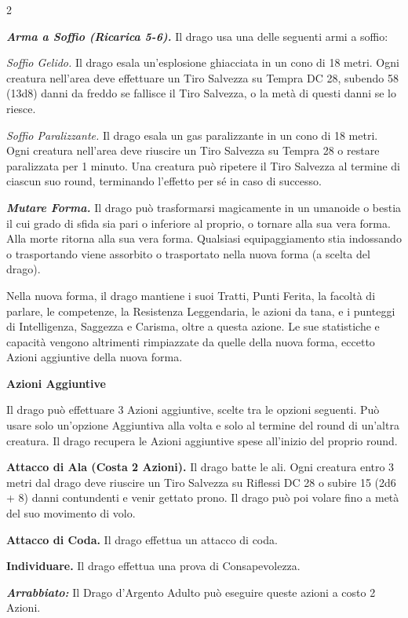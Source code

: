 \begin{multicols}{2}
{\emph{\textbf{Arma a Soffio (Ricarica 5-6).}} Il drago usa una delle seguenti armi a soffio:

\emph{Soffio Gelido.} Il drago esala un'esplosione ghiacciata in un cono di 18 metri. Ogni creatura nell'area deve effettuare un Tiro Salvezza su Tempra DC 28, subendo 58 (13d8) danni da freddo se fallisce il Tiro Salvezza, o la metà di questi danni se lo riesce.

\emph{Soffio Paralizzante.} Il drago esala un gas paralizzante in un cono di 18 metri. Ogni creatura nell'area deve riuscire un Tiro Salvezza su Tempra 28 o restare paralizzata per 1 minuto. Una creatura può ripetere il Tiro Salvezza al termine di ciascun suo round, terminando l'effetto per sé in caso di successo.

\emph{\textbf{Mutare Forma.}} Il drago può trasformarsi magicamente in un umanoide o bestia il cui grado di sfida sia pari o inferiore al proprio, o tornare alla sua vera forma. Alla morte ritorna alla sua vera forma. Qualsiasi equipaggiamento stia indossando o trasportando viene assorbito o trasportato nella nuova forma (a scelta del drago).

Nella nuova forma, il drago mantiene i suoi Tratti, Punti Ferita, la facoltà di parlare, le competenze, la Resistenza Leggendaria, le azioni da tana, e i punteggi di Intelligenza, Saggezza e Carisma, oltre a questa azione. Le sue statistiche e capacità vengono altrimenti rimpiazzate da quelle della nuova forma, eccetto Azioni aggiuntive della nuova forma.

\textbf{Azioni Aggiuntive}

Il drago può effettuare 3 Azioni aggiuntive, scelte tra le opzioni seguenti. Può usare solo un'opzione Aggiuntiva alla volta e solo al termine del round di un'altra creatura. Il drago recupera le Azioni aggiuntive spese all'inizio del proprio round.

\textbf{Attacco di Ala (Costa 2 Azioni).} Il drago batte le ali. Ogni creatura entro 3 metri dal drago deve riuscire un Tiro Salvezza su Riflessi DC 28 o subire 15 (2d6 + 8) danni contundenti e venir gettato prono. Il drago può poi volare fino a metà del suo movimento di volo.

\textbf{Attacco di Coda.} Il drago effettua un attacco di coda.

\textbf{Individuare.} Il drago effettua una prova di Consapevolezza.

\emph{\textbf{Arrabbiato:}} Il Drago d'Argento Adulto può eseguire queste azioni a costo 2 Azioni.

}
\end{multicols}
